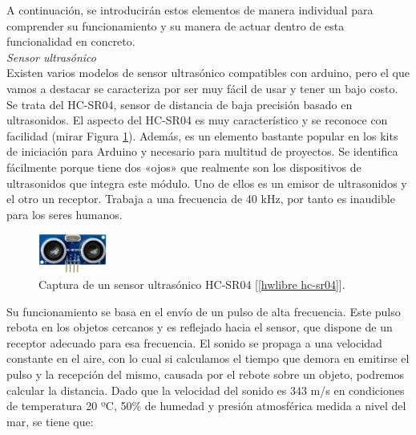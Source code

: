 \documentclass[12pt]{article}
\begin{document}
	\noindent A continuación, se introducirán estos elementos de manera individual para comprender su funcionamiento y su manera de actuar dentro de esta funcionalidad en concreto. \\
	
	\noindent \textit{Sensor ultrasónico}\\
	
	\noindent Existen varios modelos de sensor ultrasónico compatibles con arduino, pero el que vamos a destacar se caracteriza por ser muy fácil de usar y tener un bajo costo. Se trata del HC-SR04, sensor de distancia de baja precisión basado en ultrasonidos. El aspecto del HC-SR04 es muy característico y se reconoce con facilidad (mirar Figura \ref{captura hc-sr04}). Además, es un elemento bastante popular en los kits de iniciación para Arduino y necesario para multitud de proyectos. Se identifica fácilmente porque tiene dos «ojos» que realmente son los dispositivos de ultrasonidos que integra este módulo. Uno de ellos es un emisor de ultrasonidos y el otro un receptor. Trabaja a una frecuencia de 40 kHz, por tanto es inaudible para los seres humanos. \\

	
	\begin{figure}[h]
		\begin{center}
			\includegraphics[width=0.2\textwidth]{img/hc-sr04.png}
			\caption{Captura de un sensor ultrasónico HC-SR04 [\ref{hwlibre hc-sr04}].}
			\label{captura hc-sr04}
		\end{center}
	\end{figure}
	
	\pagebreak
	
	\noindent Su
funcionamiento se basa en el envío de un pulso de alta frecuencia. Este pulso rebota en los objetos cercanos y es reflejado hacia el
sensor, que dispone de un receptor adecuado para esa frecuencia. El sonido se propaga a una velocidad constante en el aire, con lo cual si calculamos el tiempo que demora en emitirse el pulso y la recepción del mismo, causada por el rebote sobre un objeto, podremos calcular la distancia. Dado que la velocidad del sonido es 343 m/s en condiciones de temperatura 20 ºC, 50\% de humedad y presión atmosférica medida a nivel del mar, se tiene que:
	
\end{document}
